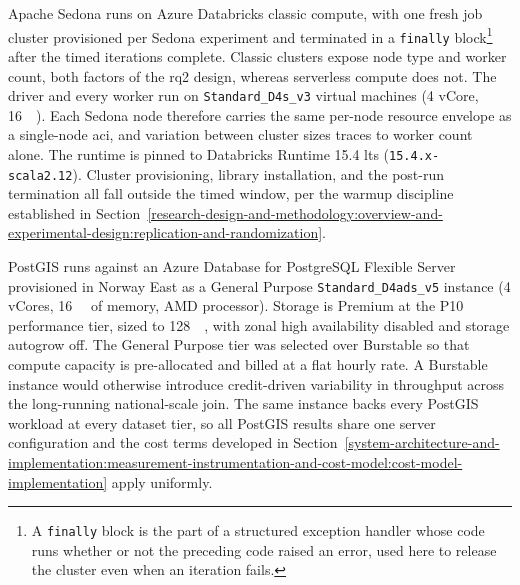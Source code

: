 Apache Sedona runs on Azure Databricks classic compute, with one fresh job cluster provisioned per Sedona experiment and terminated in a \texttt{finally} block\footnote{A \texttt{finally} block is the part of a structured exception handler whose code runs whether or not the preceding code raised an error, used here to release the cluster even when an iteration fails.} after the timed iterations complete. Classic clusters expose node type and worker count, both factors of the \acrshort{rq}2 design, whereas serverless compute does not. The driver and every worker run on \texttt{Standard\_D4s\_v3} virtual machines (\num{4} vCore, \SI{16}{\gibi\byte}). Each Sedona node therefore carries the same per-node resource envelope as a single-node \acrshort{aci}, and variation between cluster sizes traces to worker count alone. The runtime is pinned to Databricks Runtime 15.4 \acrfull{lts} (\texttt{15.4.x-scala2.12}). Cluster provisioning, library installation, and the post-run termination all fall outside the timed window, per the warmup discipline established in Section~\ref{research-design-and-methodology:overview-and-experimental-design:replication-and-randomization}.

PostGIS runs against an Azure Database for PostgreSQL Flexible Server provisioned in Norway East as a General Purpose \texttt{Standard\_D4ads\_v5} instance (\num{4} vCores, \SI{16}{\gibi\byte} of memory, AMD processor). Storage is Premium  at the P10 performance tier, sized to \SI{128}{\gibi\byte}, with zonal high availability disabled and storage autogrow off. The General Purpose tier was selected over Burstable so that compute capacity is pre-allocated and billed at a flat hourly rate. A Burstable instance would otherwise introduce credit-driven variability in throughput across the long-running national-scale join. The same instance backs every PostGIS workload at every dataset tier, so all PostGIS results share one server configuration and the cost terms developed in Section~\ref{system-architecture-and-implementation:measurement-instrumentation-and-cost-model:cost-model-implementation} apply uniformly.

